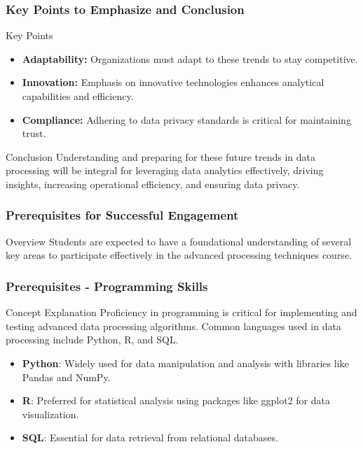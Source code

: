 \documentclass[aspectratio=169]{beamer}
\begin{document}
\begin{frame}[fragile]
    \frametitle{Key Points to Emphasize and Conclusion}
    \begin{block}{Key Points}
        \begin{itemize}
            \item \textbf{Adaptability:} Organizations must adapt to these trends to stay competitive.
            \item \textbf{Innovation:} Emphasis on innovative technologies enhances analytical capabilities and efficiency.
            \item \textbf{Compliance:} Adhering to data privacy standards is critical for maintaining trust.
        \end{itemize}
    \end{block}

    \begin{block}{Conclusion}
        Understanding and preparing for these future trends in data processing will be integral for leveraging data analytics effectively, driving insights, increasing operational efficiency, and ensuring data privacy.
    \end{block}
\end{frame}

\begin{frame}
    \frametitle{Prerequisites for Successful Engagement}
    
    \begin{block}{Overview}
        Students are expected to have a foundational understanding of several key areas to participate effectively in the advanced processing techniques course.
    \end{block}
\end{frame}

\begin{frame}
    \frametitle{Prerequisites - Programming Skills}
    
    \begin{block}{Concept Explanation}
        Proficiency in programming is critical for implementing and testing advanced data processing algorithms. Common languages used in data processing include Python, R, and SQL.
    \end{block}

    \begin{itemize}
        \item \textbf{Python}: Widely used for data manipulation and analysis with libraries like Pandas and NumPy.
        \item \textbf{R}: Preferred for statistical analysis using packages like ggplot2 for data visualization.
        \item \textbf{SQL}: Essential for data retrieval from relational databases.
    \end{itemize}
\end{frame}
\end{document}
